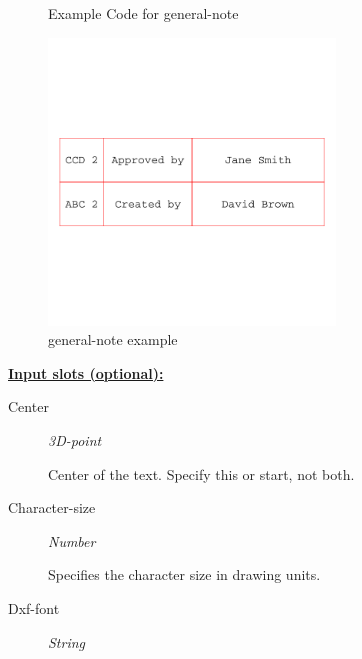 \documentclass [11pt]{book}
\begin{document}
\begin{itemize}
\begin{figure}
\begin{lrbox}{\boxedverb}
\begin{minipage}{\linewidth}
{\begin{verbatim}
\end{verbatim}}
\end{minipage}
\end{lrbox}
\fbox{\usebox{\boxedverb}}

\caption{Example Code for general-note}

\label{fig:example-code-general-note}

\end{figure}

\begin{figure}
\begin{center}
\includegraphics[width=3in,height=3in]{../images/example-general-note.pdf}
\end{center}

\caption{general-note example}

\label{fig:general-note}

\end{figure}





\textbf{
\underline{Input slots (optional):}}

\begin{description}

\item [Center]
\emph{3D-point}

 Center of the text. Specify this or start, not both.




\item [Character-size]
\emph{Number}

 Specifies the character size in drawing units.




\item [Dxf-font]
\emph{String}


\end{description}
\end{itemize}
\end{document}
